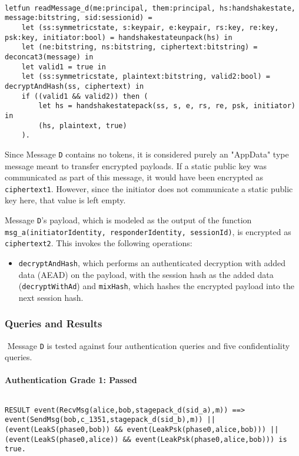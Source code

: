 \begin{lstlisting}

letfun readMessage_d(me:principal, them:principal, hs:handshakestate, message:bitstring, sid:sessionid) =
	let (ss:symmetricstate, s:keypair, e:keypair, rs:key, re:key, psk:key, initiator:bool) = handshakestateunpack(hs) in
	let (ne:bitstring, ns:bitstring, ciphertext:bitstring) = deconcat3(message) in
	let valid1 = true in
	let (ss:symmetricstate, plaintext:bitstring, valid2:bool) = decryptAndHash(ss, ciphertext) in
	if ((valid1 && valid2)) then (
		let hs = handshakestatepack(ss, s, e, rs, re, psk, initiator) in
		(hs, plaintext, true)
	).

\end{lstlisting}

Since Message \texttt{D} contains no tokens, it is considered purely an "AppData" type message meant to transfer encrypted payloads.
If a static public key was communicated as part of this message, it would have been encrypted as \texttt{ciphertext1}. However, since the initiator does not communicate a static public key here, that value is left empty.


Message \texttt{D}'s payload, which is modeled as the output of the function \texttt{msg\_a(initiatorIdentity, responderIdentity, sessionId)}, is encrypted as \texttt{ciphertext2}. This invokes the following operations:


\begin{itemize}

\item \texttt{decryptAndHash}, which performs an authenticated decryption with added data (AEAD) on the payload, with the session hash as the added data (\texttt{decryptWithAd}) and \texttt{mixHash}, which hashes the encrypted payload into the next session hash.

\end{itemize}
\subsubsection{Queries and Results}$ $
Message \texttt{D} is tested against four authentication queries and five confidentiality queries.
\paragraph{Authentication Grade 1: Passed}$ $
\begin{lstlisting}
RESULT event(RecvMsg(alice,bob,stagepack_d(sid_a),m)) ==> event(SendMsg(bob,c_1351,stagepack_d(sid_b),m)) || (event(LeakS(phase0,bob)) && event(LeakPsk(phase0,alice,bob))) || (event(LeakS(phase0,alice)) && event(LeakPsk(phase0,alice,bob))) is true.
\end{lstlisting}


